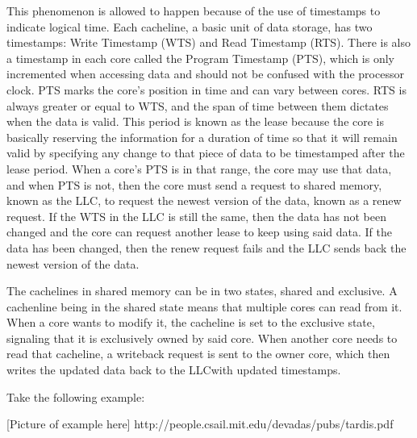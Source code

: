 \documentclass[12pt]{article}
\begin{document}
This phenomenon is allowed to happen because of the use of timestamps to indicate logical time. Each cacheline, a basic unit of data storage, has two timestamps: Write Timestamp (WTS) and Read Timestamp (RTS). There is also a timestamp in each core called the Program Timestamp (PTS), which is only incremented when accessing data and should not be confused with the processor clock. PTS marks the core’s position in time and can vary between cores. RTS is always greater or equal to WTS, and the span of time between them dictates when the data is valid. This period is known as the lease because the core is basically reserving the information for a duration of time so that it will remain valid by specifying any change to that piece of data to be timestamped after the lease period. When a core’s PTS is in that range, the core may use that data, and when PTS is not, then the core must send a request to shared memory, known as the LLC, to request the newest version of the data, known as a renew request. If the WTS in the LLC is still the same, then the data has not been changed and the core can request another lease to keep using said data. If the data has been changed, then the renew request fails and the LLC sends back the newest version of the data.

The cachelines in shared memory can be in two states, shared and exclusive. A cachenline being in the shared state means that multiple cores can read from it. When a core wants to modify it, the cacheline is set to the exclusive state, signaling that it is exclusively owned by said core. When another core needs to read that cacheline, a writeback request is sent to the owner core, which then writes the updated data back to the LLCwith updated timestamps.

Take the following example:

[Picture of example here] http://people.csail.mit.edu/devadas/pubs/tardis.pdf
\end{document}

